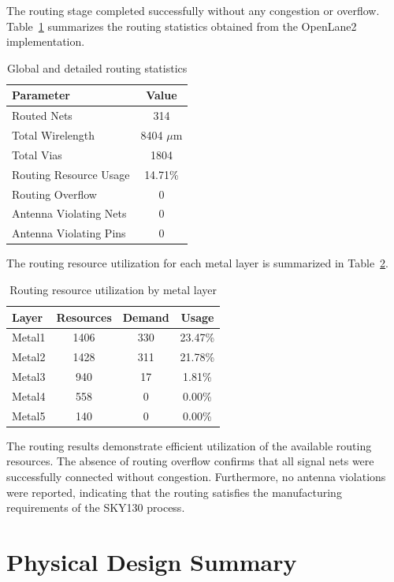 The routing stage completed successfully without any congestion or overflow. Table~\ref{tab:routing_metrics} summarizes the routing statistics obtained from the OpenLane2 implementation.

\begin{table}[!htbp]
\centering
\caption{Global and detailed routing statistics}
\label{tab:routing_metrics}
\begin{tabular}{lc}
\toprule
Parameter & Value\\
\midrule
Routed Nets & 314\\
Total Wirelength & 8404 $\mu$m\\
Total Vias & 1804\\
Routing Resource Usage & 14.71\%\\
Routing Overflow & 0\\
Antenna Violating Nets & 0\\
Antenna Violating Pins & 0\\
\bottomrule
\end{tabular}
\end{table}

The routing resource utilization for each metal layer is summarized in Table~\ref{tab:layer_usage}.

\begin{table}[!htbp]
\centering
\caption{Routing resource utilization by metal layer}
\label{tab:layer_usage}
\begin{tabular}{lccc}
\toprule
Layer & Resources & Demand & Usage\\
\midrule
Metal1 & 1406 & 330 & 23.47\%\\
Metal2 & 1428 & 311 & 21.78\%\\
Metal3 & 940 & 17 & 1.81\%\\
Metal4 & 558 & 0 & 0.00\%\\
Metal5 & 140 & 0 & 0.00\%\\
\bottomrule
\end{tabular}
\end{table}

The routing results demonstrate efficient utilization of the available routing resources. The absence of routing overflow confirms that all signal nets were successfully connected without congestion. Furthermore, no antenna violations were reported, indicating that the routing satisfies the manufacturing requirements of the SKY130 process.


\section{Physical Design Summary}

